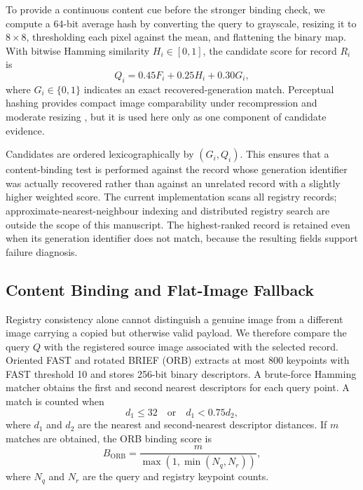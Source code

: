 \documentclass[a4paper,fleqn]{cas-sc}
\begin{document}
To provide a continuous content cue before the stronger binding check, we
compute a 64-bit average hash by converting the query to grayscale, resizing it
to $8\times8$, thresholding each pixel against the mean, and flattening the
binary map. With bitwise Hamming similarity $H_i\in[0,1]$, the candidate score
for record $R_i$ is
\begin{equation}
  Q_i=0.45F_i+0.25H_i+0.30G_i,
  \label{eq:candidate-score}
\end{equation}
where $G_i\in\{0,1\}$ indicates an exact recovered-generation match.
Perceptual hashing provides compact image comparability under recompression
and moderate resizing \cite{sharma_distance_2024,wang_perceptual_2021}, but it
is used here only as one component of candidate evidence.

Candidates are ordered lexicographically by $(G_i,Q_i)$. This ensures that a
content-binding test is performed against the record whose generation
identifier was actually recovered rather than against an unrelated record with
a slightly higher weighted score. The current implementation scans all
registry records; approximate-nearest-neighbour indexing and distributed
registry search are outside the scope of this manuscript. The highest-ranked
record is retained even when its generation identifier does not match, because
the resulting fields support failure diagnosis.

\subsection{Content Binding and Flat-Image Fallback}
Registry consistency alone cannot distinguish a genuine image from a
different image carrying a copied but otherwise valid payload. We therefore
compare the query $Q$ with the registered source image associated with the
selected record. Oriented FAST and rotated BRIEF (ORB)
\cite{rublee_orb_2011} extracts at most 800 keypoints with FAST threshold 10
and stores 256-bit binary descriptors. A brute-force Hamming matcher obtains
the first and second nearest descriptors for each query point. A match is
counted when
\begin{equation}
  d_1\le 32
  \quad\text{or}\quad
  d_1<0.75d_2,
  \label{eq:orb-match-rule}
\end{equation}
where $d_1$ and $d_2$ are the nearest and second-nearest descriptor distances.
If $m$ matches are obtained, the ORB binding score is
\begin{equation}
  B_{\mathrm{ORB}}
  =\frac{m}{\max\!\left(1,\min(N_q,N_r)\right)},
  \label{eq:orb-score}
\end{equation}
where $N_q$ and $N_r$ are the query and registry keypoint counts.
\end{document}
